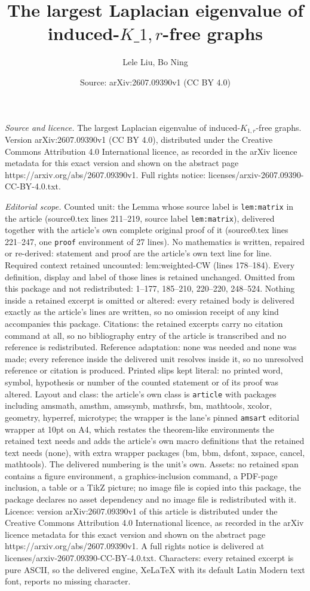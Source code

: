 \documentclass[10pt,a4paper]{amsart}
\title[The largest Laplacian eigenvalue of induced-$K\_{1,r}$-free g]{The largest Laplacian eigenvalue of induced-$K\_{1,r}$-free graphs}
\author{Lele Liu, Bo Ning}
\date{Source: arXiv:2607.09390v1 (CC BY 4.0)}
\begin{document}
\maketitle

\noindent\emph{Source and licence.} The largest Laplacian eigenvalue of induced-$K_{1,r}$-free graphs. Version arXiv:2607.09390v1 (CC BY 4.0), distributed under the Creative Commons Attribution 4.0 International licence, as recorded in the arXiv licence metadata for this exact version and shown on the abstract page https://arxiv.org/abs/2607.09390v1. Full rights notice: licenses/arxiv-2607.09390-CC-BY-4.0.txt.\par\smallskip

\noindent\textit{Editorial scope.} Counted unit: the Lemma whose source label is \texttt{lem:matrix} in the article (source0.tex lines 211--219, source label \texttt{lem:matrix}), delivered together with the article's own complete original proof of it (source0.tex lines 221--247, one \texttt{proof} environment of 27 lines). No mathematics is written, repaired or re-derived: statement and proof are the article's own text line for line. Required context retained uncounted: lem:weighted-CW (lines 178--184). Every definition, display and label of those lines is retained unchanged. Omitted from this package and not redistributed: 1--177, 185--210, 220--220, 248--524. Nothing inside a retained excerpt is omitted or altered: every retained body is delivered exactly as the article's lines are written, so no omission receipt of any kind accompanies this package. Citations: the retained excerpts carry no citation command at all, so no bibliography entry of the article is transcribed and no reference is redistributed. Reference adaptation: none was needed and none was made; every reference inside the delivered unit resolves inside it, so no unresolved reference or citation is produced. Printed slips kept literal: no printed word, symbol, hypothesis or number of the counted statement or of its proof was altered. Layout and class: the article's own class is \texttt{article} with packages including amsmath, amsthm, amssymb, mathrsfs, bm, mathtools, xcolor, geometry, hyperref, microtype; the wrapper is the lane's pinned \texttt{amsart} editorial wrapper at 10pt on A4, which restates the theorem-like environments the retained text needs and adds the article's own macro definitions that the retained text needs (none), with extra wrapper packages (bm, bbm, dsfont, xspace, cancel, mathtools). The delivered numbering is the unit's own. Assets: no retained span contains a figure environment, a graphics-inclusion command, a PDF-page inclusion, a table or a TikZ picture; no image file is copied into this package, the package declares no asset dependency and no image file is redistributed with it. Licence: version arXiv:2607.09390v1 of this article is distributed under the Creative Commons Attribution 4.0 International licence, as recorded in the arXiv licence metadata for this exact version and shown on the abstract page https://arxiv.org/abs/2607.09390v1. A full rights notice is delivered at licenses/arxiv-2607.09390-CC-BY-4.0.txt. Characters: every retained excerpt is pure ASCII, so the delivered engine, XeLaTeX with its default Latin Modern text font, reports no missing character.
\end{document}
